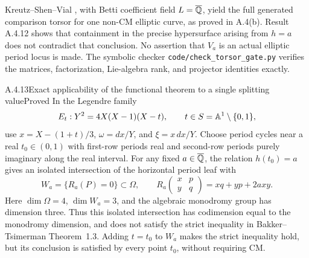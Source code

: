 Kreutz--Shen--Vial \cite[Proposition 3.1; Theorem 5.13(ii)]{GenKSV2026}, with Betti coefficient field $L=\overline{\mathbb Q}$, yield the full generated comparison torsor for one non-CM elliptic curve, as proved in A.4(b). Result A.4.12 shows that containment in the precise hypersurface arising from $h=a$ does not contradict that conclusion. No assertion that $V_a$ is an actual elliptic period locus is made. The symbolic checker \texttt{code/check\_torsor\_gate.py} verifies the matrices, factorization, Lie-algebra rank, and projector identities exactly.

\begin{result}{A.4.13}{Exact applicability of the functional theorem to a single splitting value}{Proved}
In the Legendre family
\[
 E_t:Y^2=4X(X-1)(X-t),\qquad t\in S=\mathbb A^1\setminus\{0,1\},
\]
use $x=X-(1+t)/3$, $\omega=dx/Y$, and $\xi=x\,dx/Y$. Choose period cycles near a real $t_0\in(0,1)$ with first-row periods real and second-row periods purely imaginary along the real interval. For any fixed $a\in\overline{\mathbb Q}$, the relation $h(t_0)=a$ gives an isolated intersection of the horizontal period leaf with
\[
 W_a=\{R_a(P)=0\}\subset\Omega,\qquad
 R_a\begin{pmatrix}x&p\\y&q\end{pmatrix}=xq+yp+2axy.
\]
Here $\dim\Omega=4$, $\dim W_a=3$, and the algebraic monodromy group has dimension three. Thus this isolated intersection has codimension equal to the monodromy dimension, and does not satisfy the strict inequality in Bakker--Tsimerman Theorem~1.3. Adding $t=t_0$ to $W_a$ makes the strict inequality hold, but its conclusion is satisfied by every point $t_0$, without requiring CM.
\end{result}

